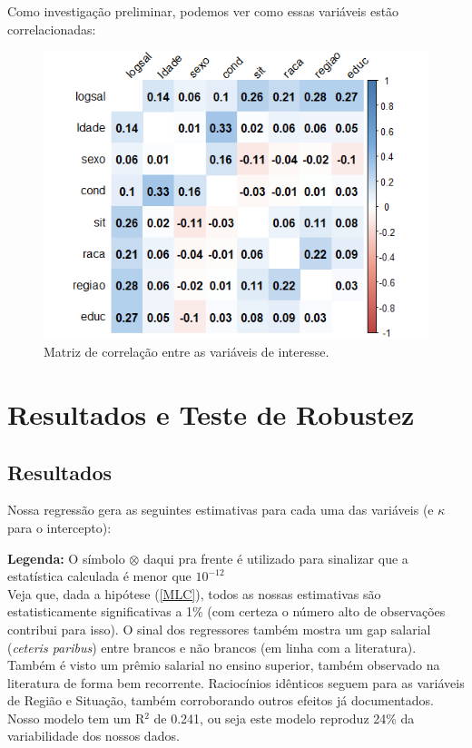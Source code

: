 \documentclass[paper=a4wide, fontsize=10pt]{scrartcl}	 %
\begin{document}
Como investigação preliminar, podemos ver como essas variáveis estão correlacionadas:

\begin{figure}[H]
\centering
\includegraphics[width=0.5\linewidth]{MatrizCorrelação.png}
\caption{Matriz de correlação entre as variáveis de interesse.}
\end{figure}

\section{Resultados e Teste de Robustez}

    \subsection{Resultados}

    Nossa regressão gera as seguintes estimativas para cada uma das variáveis (e \(\kappa\) para o intercepto):
    \begin{table}[H]
        
    \end{table}
    \textbf{Legenda:} O símbolo \(\otimes\) daqui pra frente é utilizado para sinalizar que a estatística calculada é menor que \(10^{-12}\)\\

Veja que, dada a hipótese (\ref{MLC}), todos as nossas estimativas são estatisticamente significativas a 1\% (com certeza o número alto de observações contribui para isso). O sinal dos regressores também mostra um gap salarial (\textit{ceteris paribus}) entre brancos e não brancos (em linha com a literatura).
Também é visto um prêmio salarial no ensino superior, também observado na literatura de forma bem recorrente. Raciocínios idênticos seguem para as variáveis de Região e Situação, também corroborando outros efeitos já documentados.
Nosso modelo tem um R\(^2\) de 0.241, ou seja este modelo reproduz 24\% da variabilidade dos nossos dados.
\newpage
\end{document}
